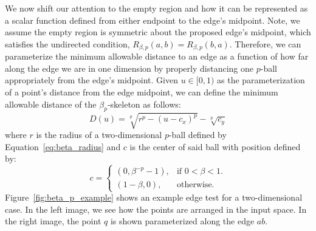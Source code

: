 We now shift our attention to the empty region and how it can be represented as a scalar function defined from either endpoint to the edge's midpoint.
%
Note, we assume the empty region is symmetric about the proposed edge's midpoint, which satisfies the undirected condition, $R_{\beta,p}(a,b)=R_{\beta,p}(b,a)$.
%
Therefore, we can parameterize the minimum allowable distance to an edge as a function of how far along the edge we are in one dimension by properly distancing one $p$-ball appropriately from the edge's midpoint.
%
Given $u \in [0, 1)$ as the parameterization of a point's distance from the edge midpoint, we can define the minimum allowable distance of the $\beta_p$-skeleton as follows:
%
\begin{equation}
    \label{eq:beta_parameterization}
    D(u) = \sqrt[p]{r^{p} - (u - c_x)^p} - \sqrt[p]{c_y}
\end{equation}
%
where $r$ is the radius of a two-dimensional $p$-ball defined by Equation~\ref{eq:beta_radius} and $c$ is the center of said ball with position defined by:
%
\begin{equation}
    c =
    \begin{cases}
        \left(0, \beta^{-p} - 1\right), & \text{if $0 < \beta < 1$}.\\
       \left(1-\beta, 0\right), & \text{otherwise}.
    \end{cases}
\end{equation}
%
Figure~\ref{fig:beta_p_example} shows an example edge test for a two-dimensional case.
%
In the left image, we see how the points are arranged in the input space.
%
In the right image, the point $q$ is shown parameterized along the edge $ab$.

